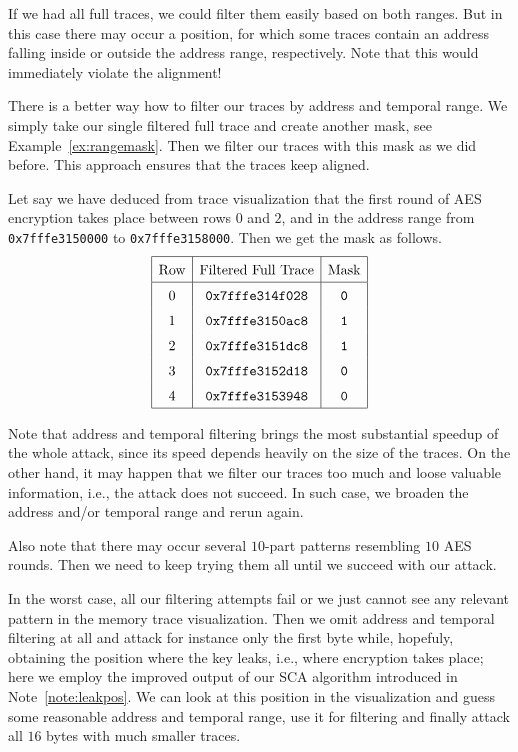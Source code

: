 		If we had all full traces, we could filter them easily based on both ranges. But in this case there may occur a position, for which some traces contain an address falling inside or outside the address range, respectively. Note that this would immediately violate the alignment!
		
		\begin{remark}
		\label{rem:rangemask}
			There is a better way how to filter our traces by address and temporal range. We simply take our single filtered full trace and create another mask, see Example~\ref{ex:rangemask}. Then we filter our traces with this mask as we did before. This approach ensures that the traces keep aligned.
		\end{remark}
		
		\begin{example}
		\label{ex:rangemask}
			Let say we have deduced from trace visualization that the first round of AES encryption takes place between rows $0$ and $2$, and in the address range from {\tt 0x7fffe3150000} to {\tt 0x7fffe3158000}. Then we get the mask as follows.
			\[
			\arraycolsep=.5em\def\arraystretch{1.5}
				\begin{array}{|c|c|c|}
					\hline
					\textnormal{Row} & \textnormal{Filtered Full Trace} & \textnormal{Mask} \\
					\hline
					0 & {\tt 0x7fffe314f028} & {\tt 0} \\
					1 & {\tt 0x7fffe3150ac8} & {\tt 1} \\
					2 & {\tt 0x7fffe3151dc8} & {\tt 1} \\
					3 & {\tt 0x7fffe3152d18} & {\tt 0} \\
					4 & {\tt 0x7fffe3153948} & {\tt 0} \\
					\hline
				\end{array}
			\]
		\end{example}
		
		Note that address and temporal filtering brings the most substantial speedup of the whole attack, since its speed depends heavily on the size of the traces. On the other hand, it may happen that we filter our traces too much and loose valuable information, i.e., the attack does not succeed. In such case, we broaden the address and/or temporal range and rerun again.
		
		Also note that there may occur several $10$-part patterns resembling $10$ AES rounds. Then we need to keep trying them all until we succeed with our attack.
		
		In the worst case, all our filtering attempts fail or we just cannot see any relevant pattern in the memory trace visualization. Then we omit address and temporal filtering at all and attack for instance only the first byte while, hopefuly, obtaining the position where the key leaks, i.e., where encryption takes place; here we employ the improved output of our SCA algorithm introduced in Note~\ref{note:leakpos}. We can look at this position in the visualization and guess some reasonable address and temporal range, use it for filtering and finally attack all $16$ bytes with much smaller traces.


